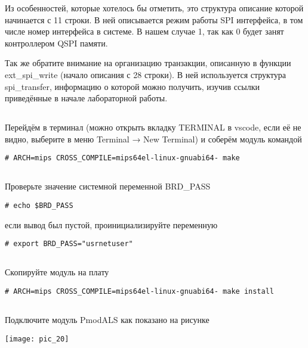 Из особенностей, которые хотелось бы отметить, это структура описание которой начинается с 11 строки. В ней описывается режим работы SPI интерфейса, в том числе номер интерфейса в системе. В нашем случае 1, так как 0 будет занят контроллером QSPI памяти.

Так же обратите внимание на организацию транзакции, описанную в функции  ext\_spi\_write (начало описания с 28 строки). В ней используется структура spi\_transfer, информацию о которой можно получить, изучив ссылки приведённые в начале лабораторной работы.

\subsection{}Перейдём в терминал (можно открыть вкладку TERMINAL в vscode, если её не видно, выберите в меню Terminal → New Terminal) и соберём модуль командой
\begin{lstlisting}[style=bash]
# ARCH=mips CROSS_COMPILE=mips64el-linux-gnuabi64- make 
\end{lstlisting}

\subsection{}Проверьте значение системной переменной BRD\_PASS  
\begin{lstlisting}[style=bash]
	# echo $BRD_PASS
\end{lstlisting}
если вывод был пустой, проинициализируйте переменную 
\begin{lstlisting}[style=bash]
	# export BRD_PASS="usrnetuser" 
\end{lstlisting}

\subsection{}Скопируйте модуль на плату
\begin{lstlisting}[style=bash]
	# ARCH=mips CROSS_COMPILE=mips64el-linux-gnuabi64- make install
\end{lstlisting}

\subsection{}Подключите модуль PmodALS как показано на рисунке 
\begin{center}
	\texttt{[image: pic\_20]}
\end{center}

